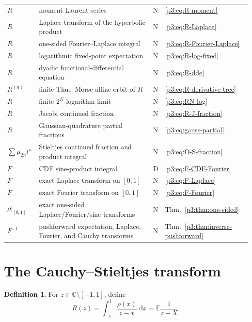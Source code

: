 \documentclass[11pt]{article}
\theoremstyle{definition}
\newtheorem{definition}[theorem]{Definition}
\theoremstyle{remark}
\newcommand{\C}{\mathbb C}
\newcommand{\E}{\mathbb E}
\newcommand{\dd}{\,\mathrm d}
\newcommand{\statusderived}{\textsf{D}}
\newcommand{\statusnew}{\textsf{N}}
\begin{document}
\begin{longtable}{@{}p{}p{}p{}p{}@{}}
\(R\) & moment Laurent series & \statusnew & \eqref{p3:eq:R-moment} \\
\(R\) & Laplace transform of the hyperbolic product & \statusnew & \eqref{p3:eq:R-Laplace} \\
\(R\) & one-sided Fourier--Laplace integral & \statusnew & \eqref{p3:eq:R-Fourier-Laplace} \\
\(R\) & logarithmic fixed-point expectation & \statusnew & \eqref{p3:eq:R-log-fixed} \\
\(R\) & dyadic functional-differential equation & \statusnew & \eqref{p3:eq:R-dde} \\
\(R^{(n)}\) & finite Thue--Morse affine orbit of \(R\) & \statusnew & \eqref{p3:eq:R-derivative-tree} \\
\(R\) & finite \(2^N\)-logarithm limit & \statusnew & \eqref{p3:eq:RN-log} \\
\(R\) & Jacobi continued fraction & \statusnew & \eqref{p3:eq:R-J-fraction} \\
\(R\) & Gaussian-quadrature partial fractions & \statusnew & \eqref{p3:eq:gauss-partial} \\
\(\sum\mu_{2n}t^n\) & Stieltjes continued fraction and product integral & \statusnew & \eqref{p3:eq:O-S-fraction} \\
\(F\) & CDF sine-product integral & \statusderived & \eqref{p3:eq:F-CDF-Fourier} \\
\(F\) & exact Laplace transform on \([0,1]\) & \statusnew & \eqref{p3:eq:F-Laplace} \\
\(F\) & exact Fourier transform on \([0,1]\) & \statusnew & \eqref{p3:eq:F-Fourier} \\
\(\rho|_{[0,1]}\) & exact one-sided Laplace/Fourier/sine transforms & \statusnew & Thm.~\ref{p3:thm:one-sided} \\
\(F^{-1}\) & pushforward expectation, Laplace, Fourier, and Cauchy transforms & \statusnew & Thm.~\ref{p3:thm:inverse-pushforward} \\
\bottomrule
\end{longtable}
\normalsize

\section{The Cauchy--Stieltjes transform}\label{p3:sec:cauchy}

\begin{definition}
For \(z\in\C\setminus[-1,1]\), define
\begin{equation}
 R(z)=\int_{-1}^{1}\frac{\rho(x)}{z-x}\,\dd x=\E\frac1{z-X}. \label{p3:eq:R-def}
\end{equation}
\end{definition}
\end{document}
